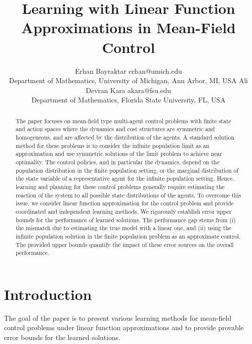 \documentclass[twoside,11pt]{article}
\begin{document}
\sloppy
\title{Learning with Linear Function Approximations in Mean-Field Control
}
\author{ \name Erhan Bayraktar \email erhan@umich.edu \\
			\addr  Department of Mathematics,
     University of Michigan, Ann Arbor, MI, USA
     \AND 
     \name Ali Devran Kara \email akara@fsu.edu \\
     \addr Department of Mathematics, Florida State University, FL, USA}






\maketitle

\begin{abstract}
The paper focuses on mean-field type multi-agent control problems with finite state and action spaces where the dynamics and cost structures are symmetric and homogeneous, and are affected by the distribution of the agents. A standard solution method for these problems is to consider the infinite population limit as an approximation and use symmetric solutions of the limit problem to achieve near optimality. The control policies, and in particular the dynamics, depend on the population distribution in the finite population setting, or the marginal distribution of the state variable of a representative agent for the infinite population setting. Hence, learning and planning for these control problems generally require estimating the reaction of the system to all possible state distributions of the agents. To overcome this issue, we consider linear function approximation for the control problem and provide coordinated and independent learning methods. We rigorously establish error upper bounds for the performance of learned solutions. The performance gap stems from (i) the mismatch due to estimating the true model with a linear one, and (ii) using the infinite population solution in the finite population problem as an approximate control. The provided upper bounds quantify the impact of these error sources on the overall performance.
\end{abstract}



\section{Introduction}

The goal of the paper is to present various learning methods for mean-field control problems under linear function approximations and to provide provable error bounds for the learned solutions.
\end{document}

